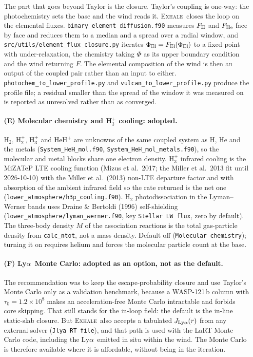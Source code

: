 \documentclass[english,a4paper]{my_memo}
\newcommand{\EXHALE}{\textsc{Exhale}}
\newcommand{\Lya}{Ly$\alpha$}
\begin{document}
The part that goes beyond Taylor is the closure. Taylor's coupling is one-way:
the photochemistry sets the base and the wind reads it. \EXHALE\ closes the
loop on the elemental fluxes. \texttt{binary\_element\_diffusion.f90} measures
$F_{\rm H}$ and $F_{\rm He}$ face by face and reduces them to a median and a
spread over a radial window, and \texttt{src/utils/element\_flux\_closure.py}
iterates $\Phi_{\rm El} = F_{\rm El}(\Phi_{\rm El})$ to a fixed point with
under-relaxation, the chemistry taking $\Phi$ as its upper boundary condition
and the wind returning $F$. The elemental composition of the wind is then an
output of the coupled pair rather than an input to either.
\texttt{photochem\_to\_lower\_profile.py} and
\texttt{vulcan\_to\_lower\_profile.py} produce the profile file; a residual
smaller than the spread of the window it was measured on is reported as
unresolved rather than as converged.

\paragraph{(E) Molecular chemistry and H$_3^+$ cooling: adopted.}
H$_2$, H$_2^+$, H$_3^+$ and HeH$^+$ are unknowns of the same coupled system as
H, He and the metals (\texttt{System\_HeH\_mol.f90},
\texttt{System\_HeH\_mol\_metals.f90}), so the molecular and metal blocks share
one electron density. H$_3^+$ infrared cooling is the MiZATeP LTE cooling
function (Mizus et al.\ 2017; the Miller et al.\ 2013 fit until 2026-10-10)
with the Miller et al.\ (2013) non-LTE departure factor and with absorption of the ambient
infrared field so the rate returned is the net one
(\texttt{lower\_atmosphere/h3p\_cooling.f90}). H$_2$ photodissociation in the
Lyman--Werner bands uses Draine \& Bertoldi (1996) self-shielding
(\texttt{lower\_atmosphere/lyman\_werner.f90}, key
\texttt{Stellar LW flux}, zero by default). The three-body density $M$ of the
association reactions is the total gas-particle density from
\texttt{calc\_ntot}, not a mass density. Default off
(\texttt{Molecular chemistry}); turning it on requires helium and forces the
molecular particle count at the base.

\paragraph{(F) \Lya\ Monte Carlo: adopted as an option, not as the default.}
The recommendation was to keep the escape-probability closure and use Taylor's
Monte Carlo only as a validation benchmark, because a WASP-121\,b column with
$\tau_0 = 1.2\times10^8$ makes an acceleration-free Monte Carlo intractable
and forbids core skipping. That still stands for the in-loop field: the default
is the in-line static-slab closure. But \EXHALE\ also accepts a
tabulated $J_{\rm Ly\alpha}(r)$ from any external solver
(\texttt{Jlya RT file}), and that path is used with the LaRT Monte Carlo code,
including the \Lya\ emitted in situ within the wind. The Monte Carlo is
therefore available where it is affordable, without being in the iteration.
\end{document}
